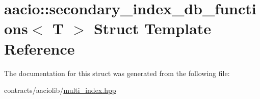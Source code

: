 \hypertarget{structaacio_1_1secondary__index__db__functions}{}\section{aacio\+:\+:secondary\+\_\+index\+\_\+db\+\_\+functions$<$ T $>$ Struct Template Reference}
\label{structaacio_1_1secondary__index__db__functions}


The documentation for this struct was generated from the following file\+:\begin{DoxyCompactItemize}
\item 
contracts/aaciolib/\mbox{\hyperlink{multi__index_8hpp}{multi\+\_\+index.\+hpp}}\end{DoxyCompactItemize}

